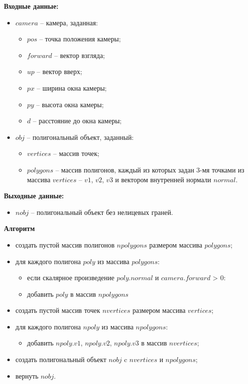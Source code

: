 \textbf{Входные данные:}
\begin{itemize}
	\item $camera$ -- камера, заданная:
	\begin{itemize}
		\item $pos$ -- точка положения камеры;
		\item $forward$ -- вектор взгляда;
		\item $up$ -- вектор вверх;
		\item $px$ -- ширина окна камеры;
		\item $py$ -- высота окна камеры;
		\item $d$ -- расстояние до окна камеры;
	\end{itemize}
	\item $obj$ -- полигональный объект, заданный:
	\begin{itemize}
		\item $vertices$ -- массив точек;
		\item $polygons$ -- массив полигонов, каждый из которых задан 3-мя точками из массива $vertices$ -- $v1$, $v2$, $v3$ и вектором внутренней нормали $normal$.
	\end{itemize}
\end{itemize}

\textbf{Выходные данные:}
\begin{itemize}
	\item $nobj$ -- полигональный объект без нелицевых граней.
\end{itemize}

\textbf{Алгоритм}

\begin{itemize}
	\item создать пустой массив полигонов $npolygons$ размером массива $polygons$;
	\item для каждого полигона $poly$ из массива $polygons$:
	\begin{itemize}
		\item если скалярное произведение $poly.normal$ и $camera.forward$ > 0:
		\item добавить $poly$ в массив $npolygons$
	\end{itemize}
	\item создать пустой массив точек $nvertices$ размером массива $vertices$;
	\item для каждого полигона $npoly$ из массива $npolygons$:
	\begin{itemize}
		\item добавить $npoly.v1$, $npoly.v2$, $npoly.v3$ в массив $nvertices$;
	\end{itemize}
	\item создать полигональный объект $nobj$ c $nvertices$ и $npolygons$;
	\item вернуть $nobj$.
\end{itemize}

